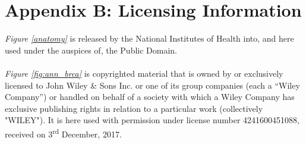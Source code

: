 \chapter*{Appendix B: Licensing Information}
\label{sec:licensing}

\emph{Figure \ref{anatomy}} is released by the National Institutes of Health into, and here used under the auspices of, the Public Domain.
\\\\
\emph{Figure \ref{fig:ann_brca}} is copyrighted material that is owned by or exclusively licensed to John Wiley \& Sons Inc. or one of its group companies (each a ``Wiley Company'') or handled on behalf of a society with which a Wiley Company has exclusive publishing rights in relation to a particular work (collectively "WILEY"). It is here used with permission under license number 4241600451088, received on 3\textsuperscript{rd} December, 2017.